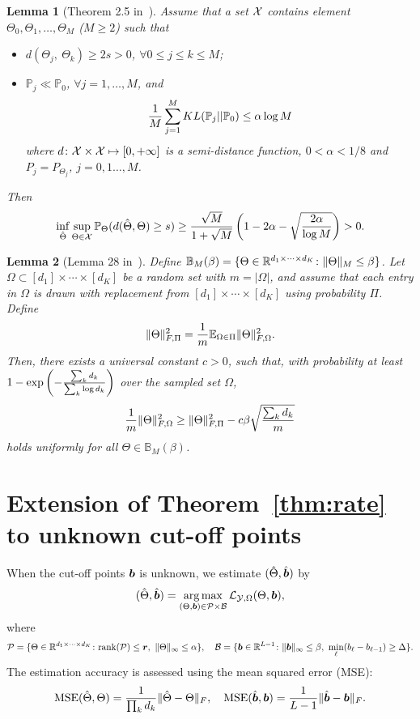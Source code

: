 \documentclass[11pt]{article}
\theoremstyle{plain}
\newtheorem{lem}{Lemma}
\theoremstyle{definition}
\begin{document}
\begin{lem}[Theorem 2.5 in~\cite{tsybakov2009introduction}]\label{lem:Tsybakov}
Assume that a set $\mathcal{X}$ contains element $\Theta_0, \Theta_1, \ldots,\Theta_M$ ($M\geq 2$) such that
\begin{itemize}
\item $d(\Theta_j,\ \Theta_k)\geq 2s>0$, $\forall 0\leq j\leq k\leq M$;
\item $\mathbb{P}_j\ll\mathbb{P}_0$, $\forall j=1,\ldots,M$, and
\[
{1\over M}\sum_{j=1}^M KL(\mathbb{P}_j||\mathbb{P}_0)\leq \alpha \log M
\]
where $d\colon \mathcal{X}\times \mathcal{X}\mapsto [0,+\infty]$ is a semi-distance function, $0<\alpha<{1/8}$ and $P_j=P_{\Theta_j}$, $j=0,1\ldots,M$.
\end{itemize}
Then
\[
\inf_{\hat \Theta}\sup_{\Theta\in\mathcal{X}} \mathbb{P}_{\Theta}(d(\hat \Theta, \Theta)\geq s)\geq {\sqrt{M}\over 1+\sqrt{M}}\left(1-2\alpha-\sqrt{2\alpha\over \log M} \right)>0.
\]
\end{lem}

\begin{lem}[Lemma 28 in~\cite{ghadermarzy2019near}]\label{lem:convexity}
Define $\mathbb{B}_{M}(\beta)=\{\Theta\in \mathbb{R}^{d_1\times \cdots \times d_K}\colon \lVert\Theta\rVert_M\leq \beta \}$.  Let $\Omega\subset[d_1]\times\cdots \times [d_K]$ be a random set with $m=|\Omega|$, and assume that each entry in $\Omega$ is drawn with replacement from $[d_1]\times\cdots\times[d_K]$ using probability $\Pi$. Define
\[
\lVert\Theta\rVert_{F,\Pi}^2={1\over m}\mathbb{E}_{\Omega\in\Pi}\lVert\Theta\rVert_{F,\Omega}^2.
\]
Then, there exists a universal constant $c>0$, such that, with probability at least $1-\exp\left(-{\sum_kd_k \over \sum_k \log d_k} \right)$ over the sampled set $\Omega$,
\[
{1\over m}\lVert\Theta\rVert_{F,\Omega}^2 \geq \lVert\Theta\rVert_{F,\Pi}^2-c\beta\sqrt{\sum_k d_k\over m}
\]
holds uniformly for all $\Theta\in\mathbb{B}_M(\beta)$.
\end{lem}


\section{Extension of Theorem~\ref{thm:rate} to unknown cut-off points}



When the cut-off points $\bm{b}$ is unknown, we estimate $(\hat \Theta,\hat {\bm{b}})$ by
\begin{equation}\label{eq:joint}
(\hat \Theta,\hat {\bm{b}})=\operatorname*{arg\,max}_{(\Theta,\bm{b})\in\mathcal{P}\times \mathcal{B}}\mathcal{L}_{\mathcal{Y},\Omega}(\Theta,\bm{b}),
\end{equation}
where 
\[
\tP=\{\Theta\in\mathbb{R}^{d_1\times \cdots\times d_K}\colon \text{rank}(\tP)\leq \mr,\ \mnormSize{}{\Theta}\leq \alpha\}, \quad \tB=\{\mb\in\mathbb{R}^{L-1}\colon \mnormSize{}{\mb}\leq \beta,\ \min_{\ell}(b_\ell-b_{\ell-1}) \geq \Delta\}.
\]
The estimation accuracy is assessed using the mean squared error (MSE):
\[
\text{MSE}(\hat \Theta,\Theta)={1\over \prod_k d_k}\lVert\hat \Theta-\Theta\rVert_F,\quad \text{MSE}(\hat {\bm{b}},\bm{b})={1\over L-1}\lVert\hat {\bm{b}}-\bm{b}\rVert_F.
\]
\end{document}
